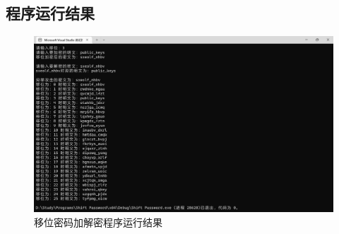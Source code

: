 \subsection{程序运行结果}
\begin{figure}[thbp!]
	\centering
	\includegraphics[width=16cm]{figure/002.png}
	\caption{移位密码加解密程序运行结果}
	\label{fig:移位密码加解密程序运行结果}
\end{figure}

%	
%	
%	


























